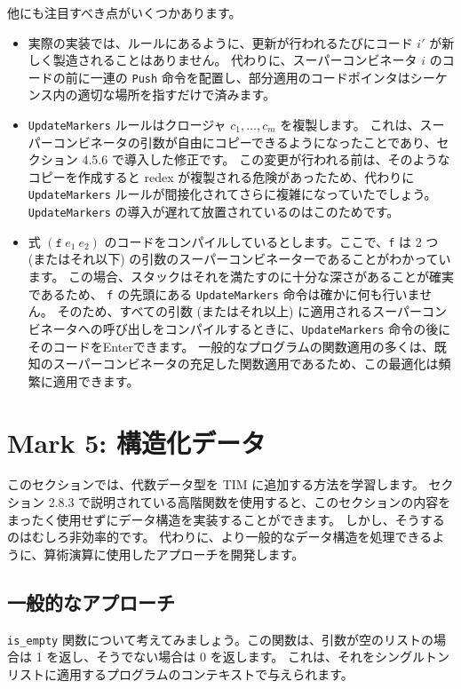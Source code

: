 \documentclass{jbook}
\begin{document}
他にも注目すべき点がいくつかあります。

\begin{itemize}
	\item 実際の実装では、ルールにあるように、更新が行われるたびにコード $i'$ が新しく製造されることはありません。
	      代わりに、スーパーコンビネータ $i$ のコードの前に一連の \texttt{Push} 命令を配置し、部分適用のコードポインタはシーケンス内の適切な場所を指すだけで済みます。
	\item \texttt{UpdateMarkers} ルールはクロージャ $c_1, \ldots, c_m$ を複製します。
	      これは、スーパーコンビネータの引数が自由にコピーできるようになったことであり、セクション 4.5.6 で導入した修正です。
	      この変更が行われる前は、そのようなコピーを作成すると redex が複製される危険があったため、代わりに \texttt{UpdateMarkers} ルールが間接化されてさらに複雑になっていたでしょう。
	      \texttt{UpdateMarkers} の導入が遅れて放置されているのはこのためです。
	\item 式 $(\texttt{f} ~ e_1 ~ e_2)$ のコードをコンパイルしているとします。ここで、\texttt{f} は 2 つ (またはそれ以下) の引数のスーパーコンビネーターであることがわかっています。
	      この場合、スタックはそれを満たすのに十分な深さがあることが確実であるため、 \texttt{f} の先頭にある \texttt{UpdateMarkers} 命令は確かに何も行いません。
	      そのため、すべての引数 (またはそれ以上) に適用されるスーパーコンビネータへの呼び出しをコンパイルするときに、\texttt{UpdateMarkers} 命令の後にそのコードをEnterできます。
	      一般的なプログラムの関数適用の多くは、既知のスーパーコンビネータの充足した関数適用であるため、この最適化は頻繁に適用できます。
\end{itemize}
\newpage

\section{Mark 5: 構造化データ}

このセクションでは、代数データ型を TIM に追加する方法を学習します。
セクション 2.8.3 で説明されている高階関数を使用すると、このセクションの内容をまったく使用せずにデータ構造を実装することができます。
しかし、そうするのはむしろ非効率的です。
代わりに、より一般的なデータ構造を処理できるように、算術演算に使用したアプローチを開発します。

\subsection{一般的なアプローチ}

\texttt{is\_empty} 関数について考えてみましょう。この関数は、引数が空のリストの場合は 1 を返し、そうでない場合は 0 を返します。
これは、それをシングルトン リストに適用するプログラムのコンテキストで与えられます。
\end{document}
